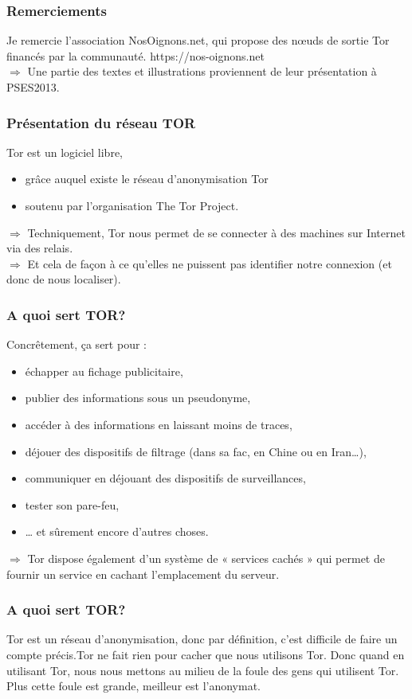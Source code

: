 \documentclass{beamer}
\begin{document}
\begin{frame}
\frametitle{Remerciements}
Je remercie l'association NosOignons.net, qui propose des nœuds de sortie Tor financés par la communauté.
https://nos-oignons.net
 \\ $\Rightarrow$ Une partie des textes et illustrations proviennent de leur présentation à PSES2013.
\end{frame}


\begin{frame}
\frametitle{Présentation du réseau TOR}
Tor est un logiciel libre,
\begin{itemize}
\item grâce auquel existe le réseau d'anonymisation Tor
\item  soutenu par l'organisation The Tor Project.
\end{itemize}
$\Rightarrow$ Techniquement, Tor nous permet de se connecter à des machines sur Internet via des relais. 
\\$\Rightarrow$ Et cela de façon à ce qu'elles ne puissent pas identifier notre connexion (et donc de nous localiser).
\end{frame}


\begin{frame}
\frametitle{A quoi sert TOR?}

Concrêtement, ça sert pour :
\begin{itemize}
\item  échapper au fichage publicitaire,
\item  publier des informations sous un pseudonyme,
\item  accéder à des informations en laissant moins de traces,
\item  déjouer des dispositifs de filtrage (dans sa fac, en Chine ou en Iran…),
\item  communiquer en déjouant des dispositifs de surveillances,
\item  tester son pare-feu,
\item  … et sûrement encore d'autres choses.
\end{itemize}
$\Rightarrow$ Tor dispose également d'un système de « services cachés » qui permet de fournir un service en cachant l'emplacement du serveur.
\end{frame}



\begin{frame}
\frametitle{A quoi sert TOR?}

Tor est un réseau d'anonymisation, donc par définition, c'est difficile de faire un compte
précis.Tor ne fait rien pour cacher que nous utilisons Tor. Donc quand en utilisant
Tor, nous nous mettons au milieu de la foule des gens qui utilisent Tor. Plus
cette foule est grande, meilleur est l'anonymat.
\end{frame}
\end{document}
